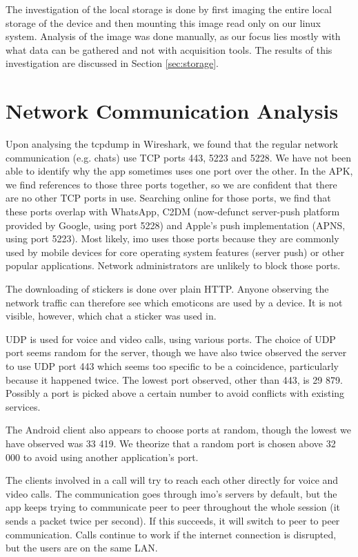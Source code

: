 \documentclass[conference]{IEEEtran}
\begin{document}
The investigation of the local storage is done by first imaging the entire local
storage of the device and then mounting this image read only on our linux
system. Analysis of the image was done manually, as our focus lies mostly with
what data can be gathered and not with acquisition tools. The results of this
investigation are discussed in Section \ref{sec:storage}.


\section{Network Communication Analysis}\label{sec:network}

Upon analysing the tcpdump in Wireshark, we found that the regular network
communication (e.g. chats) use TCP ports 443, 5223 and 5228. We have not been
able to identify why the app sometimes uses one port over the other. In the APK,
we find references to those three ports together, so we are confident that there
are no other TCP ports in use.  Searching online for those ports, we find that
these ports overlap with WhatsApp, C2DM (now-defunct server-push platform
provided by Google, using port 5228) and Apple's push implementation (APNS,
using port 5223). Most likely, imo uses those ports because they are commonly
used by mobile devices for core operating system features (server push) or other
popular applications. Network administrators are unlikely to block those ports.

The downloading of stickers is done over plain HTTP. Anyone observing the
network traffic can therefore see which emoticons are used by a device. It is
not visible, however, which chat a sticker was used in.

UDP is used for voice and video calls, using various ports. The choice of UDP
port seems random for the server, though we have also twice observed the server
to use UDP port 443 which seems too specific to be a coincidence, particularly
because it happened twice. The lowest port observed, other than 443, is 29 879.
Possibly a port is picked above a certain number to avoid conflicts with
existing services.

The Android client also appears to choose ports at random, though the lowest we
have observed was 33 419. We theorize that a random port is chosen above 32 000
to avoid using another application's port.

The clients involved in a call will try to reach each other directly for voice
and video calls. The communication goes through imo's servers by default, but
the app keeps trying to communicate peer to peer throughout the whole session
(it sends a packet twice per second). If this succeeds, it will switch to peer
to peer communication. Calls continue to work if the internet connection is
disrupted, but the users are on the same LAN.
\end{document}
